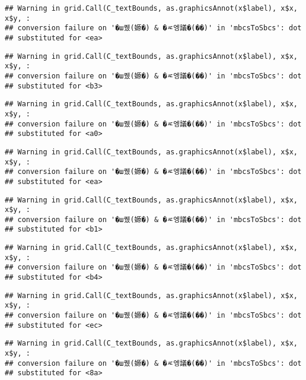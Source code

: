 \documentclass[
]{article}
\begin{document}
\begin{verbatim}
## Warning in grid.Call(C_textBounds, as.graphicsAnnot(x$label), x$x, x$y, :
## conversion failure on '�ш퀬(嫄�) & �ㅼ엥議�(��)' in 'mbcsToSbcs': dot
## substituted for <ea>
\end{verbatim}

\begin{verbatim}
## Warning in grid.Call(C_textBounds, as.graphicsAnnot(x$label), x$x, x$y, :
## conversion failure on '�ш퀬(嫄�) & �ㅼ엥議�(��)' in 'mbcsToSbcs': dot
## substituted for <b3>
\end{verbatim}

\begin{verbatim}
## Warning in grid.Call(C_textBounds, as.graphicsAnnot(x$label), x$x, x$y, :
## conversion failure on '�ш퀬(嫄�) & �ㅼ엥議�(��)' in 'mbcsToSbcs': dot
## substituted for <a0>
\end{verbatim}

\begin{verbatim}
## Warning in grid.Call(C_textBounds, as.graphicsAnnot(x$label), x$x, x$y, :
## conversion failure on '�ш퀬(嫄�) & �ㅼ엥議�(��)' in 'mbcsToSbcs': dot
## substituted for <ea>
\end{verbatim}

\begin{verbatim}
## Warning in grid.Call(C_textBounds, as.graphicsAnnot(x$label), x$x, x$y, :
## conversion failure on '�ш퀬(嫄�) & �ㅼ엥議�(��)' in 'mbcsToSbcs': dot
## substituted for <b1>
\end{verbatim}

\begin{verbatim}
## Warning in grid.Call(C_textBounds, as.graphicsAnnot(x$label), x$x, x$y, :
## conversion failure on '�ш퀬(嫄�) & �ㅼ엥議�(��)' in 'mbcsToSbcs': dot
## substituted for <b4>
\end{verbatim}

\begin{verbatim}
## Warning in grid.Call(C_textBounds, as.graphicsAnnot(x$label), x$x, x$y, :
## conversion failure on '�ш퀬(嫄�) & �ㅼ엥議�(��)' in 'mbcsToSbcs': dot
## substituted for <ec>
\end{verbatim}

\begin{verbatim}
## Warning in grid.Call(C_textBounds, as.graphicsAnnot(x$label), x$x, x$y, :
## conversion failure on '�ш퀬(嫄�) & �ㅼ엥議�(��)' in 'mbcsToSbcs': dot
## substituted for <8a>
\end{verbatim}
\end{document}
